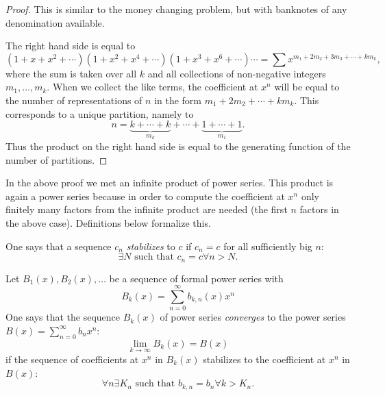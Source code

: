 \begin{page}

\begin{proof}
This is similar to the money changing problem, but with banknotes of any denomination available.

The right hand side is equal to
\[
(1+x+x^2+\cdots)(1+x^2+x^4+\cdots)(1+x^3+x^6+\cdots)\cdots = \sum x^{m_1 + 2m_2 + 3m_3 + \cdots + km_k},
\]
where the sum is taken over all $k$ and all collections of non-negative integers $m_1, \ldots, m_k$.
When we collect the like terms, the coefficient at $x^n$ will be equal to the number of representations of $n$ in the form
$m_1 + 2m_2 + \cdots + km_k$.
This corresponds to a unique partition, namely to
\[
n = \underbrace{k+\cdots+k}_{m_k} + \cdots + \underbrace{1+\cdots+1}_{m_1}.
\]
Thus the product on the right hand side is equal to the generating function of the number of partitions.
\end{proof}

In the above proof we met an infinite product of power series.
This product is again a power series because in order to compute the coefficient at $x^n$
only finitely many factors from the infinite product are needed (the first $n$ factors in the above case).
Definitions below formalize this.


\end{page}

\begin{page}

\begin{dfn}
One says that a sequence $c_n$ \emph{stabilizes} to $c$ if $c_n = c$ for all sufficiently big $n$:
\[
\exists N \text{ such that } c_n = c \forall n > N.
\]
\end{dfn}

\end{page}

\begin{page}

\begin{dfn}
Let $B_1(x), B_2(x), \ldots$ be a sequence of formal power series with
\[
B_k(x) = \sum_{n=0}^\infty b_{k,n}(x) x^n
\]
One says that the sequence $B_k(x)$ of power series \emph{converges} to the power series $B(x) = \sum_{n=0}^\infty b_n x^n$:
\[
\lim_{k \to \infty} B_k(x) = B(x)
\]
if the sequence of coefficients at $x^n$ in $B_k(x)$ stabilizes to the coefficient at $x^n$ in $B(x)$:
\[
\forall n \exists K_n \text{ such that } b_{k,n} = b_n \forall k > K_n.
\]
\end{dfn}

\end{page}

